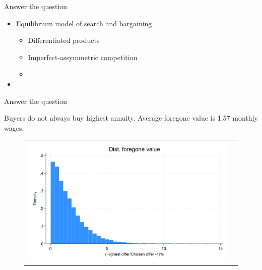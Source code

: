 \documentclass[notes, 10pt,aspectratio=169]{beamer}
\begin{document}





\begin{frame}{Answer the question}
    \begin{itemize}
        \item Equilibrium model of search and bargaining 
        \begin{itemize}
            \ite
            \item Differentiated products   \hyperlink{slide:fig3}{}
            \item Imperfect-assymmetric competition\hyperlink{slide:fig3}{}
            \item 
        \end{itemize}
        \item 
    \end{itemize}

\end{frame}

\begin{frame}{Answer the question}\label{slide:fig3}    

Buyers do not always buy highest annuity. Average foregone value is 1.57 monthly wages.

\begin{figure}[H]
\centering{}%
\begin{tabular}{cc}
\includegraphics[scale=0.27]{../figures/IE3_foregone_hist.png}
\end{tabular}
\end{figure}
\end{frame}
\end{document}
